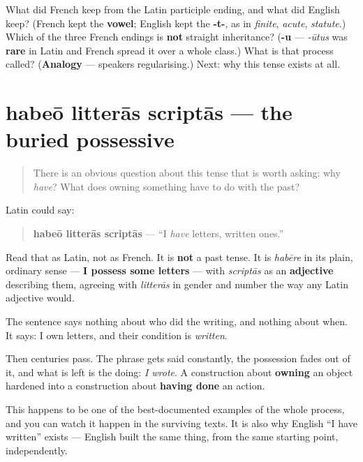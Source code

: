 \begin{tcolorbox}[breakable,colback=teal!4,colframe=teal!35!black,title={Before you move on}]
What did French keep from the Latin participle ending, and what did English keep? (French kept the \textbf{vowel}; English kept the \textbf{-t-}, as in \emph{finite}, \emph{acute}, \emph{statute}.) Which of the three French endings is \textbf{not} straight inheritance? (\textbf{-u} — \emph{-ūtus} was \textbf{rare} in Latin and French spread it over a whole class.) What is that process called? (\textbf{Analogy} — speakers regularising.) Next: why this tense exists at all.
\end{tcolorbox}
\section[habeō litterās scriptās]{habeō litterās scriptās — the buried possessive}

\label{lesson:FR-C15-possessif}



\begin{quote}
There is an obvious question about this tense that is worth asking: why \emph{have}? What does owning something have to do with the past?
\end{quote}

\begin{grammarlens}[title={Grammar Lens: it was never a tense to begin with}]
Latin could say:

\begin{quote}
\textbf{habeō litterās scriptās} — \textquotedblleft{}I \emph{have} letters, written ones.\textquotedblright{}
\end{quote}

Read that as Latin, not as French. It is \textbf{not} a past tense. It is \emph{habēre} in its plain, ordinary sense — \textbf{I possess some letters} — with \emph{scriptās} as an \textbf{adjective} describing them, agreeing with \emph{litterās} in gender and number the way any Latin adjective would.

The sentence says nothing about who did the writing, and nothing about when. It says: I own letters, and their condition is \emph{written}.

Then centuries pass. The phrase gets said constantly, the possession fades out of it, and what is left is the doing: \emph{I wrote}. A construction about \textbf{owning} an object hardened into a construction about \textbf{having done} an action.

This happens to be one of the best-documented examples of the whole process, and you can watch it happen in the surviving texts. It is also why English \textquotedblleft{}I have written\textquotedblright{} exists — English built the same thing, from the same starting point, independently.
\end{grammarlens}

